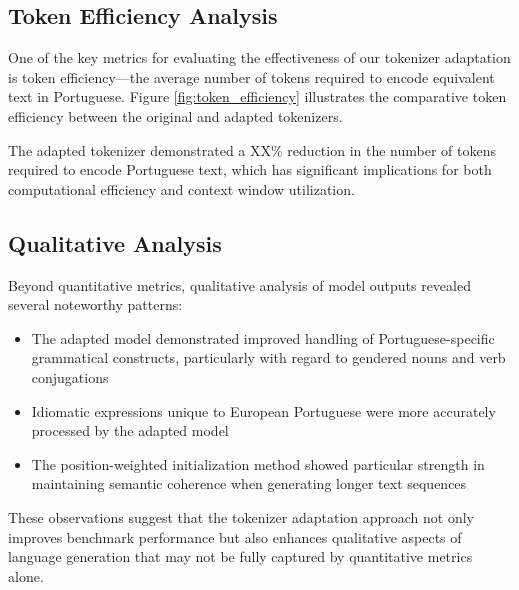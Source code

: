 \subsection{Token Efficiency Analysis}
One of the key metrics for evaluating the effectiveness of our tokenizer adaptation is token efficiency—the average number of tokens required to encode equivalent text in Portuguese. Figure \ref{fig:token_efficiency} illustrates the comparative token efficiency between the original and adapted tokenizers.

The adapted tokenizer demonstrated a XX\% reduction in the number of tokens required to encode Portuguese text, which has significant implications for both computational efficiency and context window utilization.

\subsection{Qualitative Analysis}
Beyond quantitative metrics, qualitative analysis of model outputs revealed several noteworthy patterns:

\begin{itemize}
    \item The adapted model demonstrated improved handling of Portuguese-specific grammatical constructs, particularly with regard to gendered nouns and verb conjugations
    \item Idiomatic expressions unique to European Portuguese were more accurately processed by the adapted model
    \item The position-weighted initialization method showed particular strength in maintaining semantic coherence when generating longer text sequences
\end{itemize}

These observations suggest that the tokenizer adaptation approach not only improves benchmark performance but also enhances qualitative aspects of language generation that may not be fully captured by quantitative metrics alone.